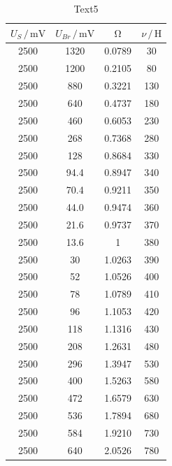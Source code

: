 \noindent
\begin{table}
\normalsize
\centering
{}
\begin{tabular}{c c c c}
\toprule
        $U_{S} \,/\,\si{\milli\volt}$ & $U_{Br} \,/\,\si{\milli\volt}$ & $\upOmega$ & $\nu \,/\, \si{\henry}$ \\
        \midrule
        2500 & 1320 &           0.0789 & 30 \\
        2500 & 1200 &           0.2105 & 80 \\
        2500 & 880 &            0.3221 & 130 \\
        2500 & 640 &            0.4737 & 180 \\
        2500 & 460 &            0.6053 & 230 \\
        2500 & 268 &            0.7368 & 280 \\
        2500 & 128 &            0.8684 & 330 \\
        2500 & 94.4 &           0.8947 & 340 \\
        2500 & 70.4 &           0.9211 & 350 \\
        2500 & 44.0 &           0.9474 & 360 \\
        2500 & 21.6 &           0.9737 & 370 \\
        2500 & 13.6 &           1 & 380 \\   
        2500 & 30 &             1.0263 & 390 \\
        2500 & 52 &             1.0526 & 400 \\
        2500 & 78 &             1.0789 & 410 \\
        2500 & 96 &             1.1053 & 420 \\
        2500 & 118 &            1.1316 & 430 \\
        2500 & 208 &            1.2631 & 480 \\
        2500 & 296 &            1.3947 & 530 \\
        2500 & 400 &            1.5263 & 580 \\
        2500 & 472 &            1.6579 & 630 \\
        2500 & 536 &            1.7894 & 680 \\
        2500 & 584 &            1.9210 & 730 \\
        2500 & 640 &            2.0526 & 780 \\
        
\bottomrule
\end{tabular}
\caption{Text5} 
\label{tab:5}
\end{table}






